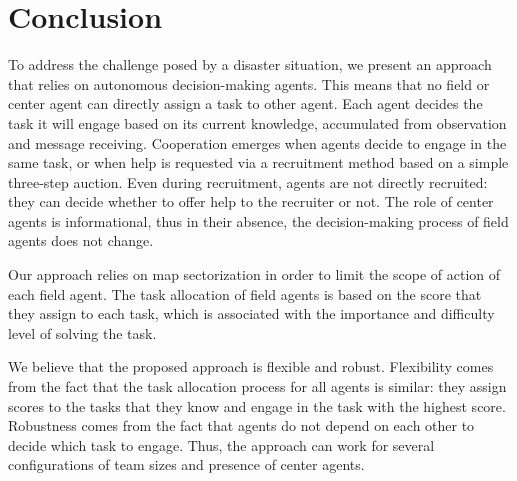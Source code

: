 \section{Conclusion}

To address the challenge posed by a disaster situation, we present an approach that relies on autonomous decision-making agents. This means that no field or center agent can directly assign a task to other agent. Each agent decides the task it will engage based on its current knowledge, accumulated from observation and message receiving. Cooperation emerges when agents decide to engage in the same task, or when help is requested via a recruitment method based on a simple three-step auction. Even during recruitment, agents are not directly recruited: they can decide whether to offer help to the recruiter or not. The role of center agents is informational, thus in their absence, the decision-making process of field agents does not change.

Our approach relies on map sectorization in order to limit the scope of action of each field agent. The task allocation of field agents is based on the score that they assign to each task, which is associated with the importance and difficulty level of solving the task. 

We believe that the proposed approach is flexible and robust. Flexibility comes from the fact that the task allocation process for all agents is similar: they assign scores to the tasks that they know and engage in the task with the highest score. Robustness comes from the fact that agents do not depend on each other to decide which task to engage. Thus, the approach can work for several configurations of team sizes and presence of center agents.

